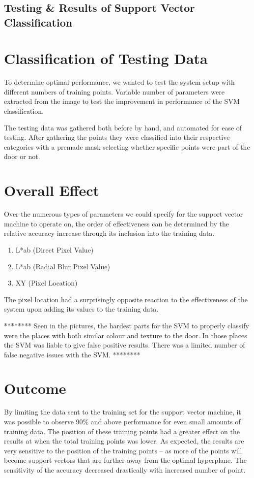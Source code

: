\section {Testing \& Results of Support Vector Classification}

\chapter{Classification of Testing Data}
To determine optimal performance, we wanted to test the system setup with different numbers of training points. Variable number of parameters were extracted from the image to test the improvement in performance of the SVM classification.

The testing data was gathered both before by hand, and automated for ease of testing. After gathering the points they were classified into their respective categories with a premade mask selecting whether specific points were part of the door or not.

\chapter{Overall Effect}

Over the numerous types of parameters we could specify for the support vector machine to operate on, the order of effectiveness can be determined by the relative accuracy increase through its inclusion into the training data.

\begin{enumerate}
  \item L*ab (Direct Pixel Value)
  \item L*ab (Radial Blur Pixel Value)
  \item XY (Pixel Location)
\end{enumerate}

The pixel location had a surprisingly opposite reaction to the effectiveness of the system upon adding its values to the training data.


********
Seen in the pictures, the hardest parts for the SVM to properly classify were the places with both similar colour and texture to the door. In those places the SVM was liable to give false positive results. There was a limited number of false negative issues with the SVM.
********

\chapter{Outcome}

By limiting the data sent to the training set for the support vector machine, it was possible to observe 90\% and above performance for even small amounts of training data. The position of these training points had a greater effect on the results at when the total training points was lower. As expected, the results are very sensitive to the position of the training points -- as more of the points will become support vectors that are further away from the optimal hyperplane. The sensitivity of the accuracy decreased drastically with increased number of point.




